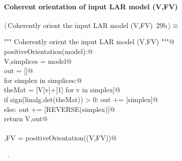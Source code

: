 \documentclass[11pt,oneside]{article}	%
\begin{document}
\paragraph{Coherent orientation of input LAR model (V,FV)}
\begin{flushleft} \small \label{scrap49}
\protect{}$\langle\,$Coherently orient the input LAR model (V,FV)\nobreak\ {\footnotesize 29b}$\,\rangle\equiv$
\vspace{-1ex}
\begin{list}{}{} \item
\mbox{}\verb@""" Coherently orient the input LAR model (V,FV) """@\\
\mbox{}\verb@def positiveOrientation(model):@\\
\mbox{}\verb@   V,simplices = model@\\
\mbox{}\verb@   out = []@\\
\mbox{}\verb@   for simplex in simplices:@\\
\mbox{}\verb@      theMat = [V[v]+[1] for v in simplex]@\\
\mbox{}\verb@      if sign(linalg.det(theMat)) > 0:  out += [simplex]@\\
\mbox{}\verb@      else: out += [REVERSE(simplex)]@\\
\mbox{}\verb@   return V,out@\\
\mbox{}\verb@@\\
\mbox{}\verb@V,FV = positiveOrientation((V,FV))@\\
\mbox{}\verb@@{\NWsep}
\end{list}
\vspace{-1ex}
\footnotesize\addtolength{\baselineskip}{-1ex}
\begin{list}{}{\setlength{\itemsep}{-\parsep}\setlength{\itemindent}{-\leftmargin}}
\item \NWtxtMacroRefIn\ .
\end{list}
\end{flushleft}
\end{document}
